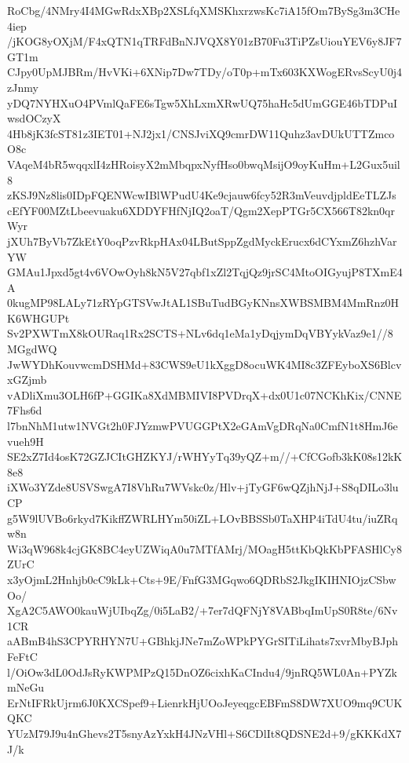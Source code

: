 RoCbg/4NMry4I4MGwRdxXBp2XSLfqXMSKhxrzwsKc7iA15fOm7BySg3m3CHe4iep
/jKOG8yOXjM/F4xQTN1qTRFdBnNJVQX8Y01zB70Fu3TiPZsUiouYEV6y8JF7GT1m
CJpy0UpMJBRm/HvVKi+6XNip7Dw7TDy/oT0p+mTx603KXWogERvsScyU0j4zJnmy
yDQ7NYHXuO4PVmlQaFE6sTgw5XhLxmXRwUQ75haHc5dUmGGE46bTDPuIwsdOCzyX
4Hb8jK3fcST81z3IET01+NJ2jx1/CNSJviXQ9cmrDW11Quhz3avDUkUTTZmcoO8c
VAqeM4bR5wqqxlI4zHRoisyX2mMbqpxNyfHso0bwqMsijO9oyKuHm+L2Gux5uil8
zKSJ9Nz8lis0IDpFQENWcwIBlWPudU4Ke9cjauw6fcy52R3mVeuvdjpldEeTLZJs
cEfYF00MZtLbeevuaku6XDDYFHfNjIQ2oaT/Qgm2XepPTGr5CX566T82kn0qrWyr
jXUh7ByVb7ZkEtY0oqPzvRkpHAx04LButSppZgdMyckErucx6dCYxmZ6hzhVarYW
GMAu1Jpxd5gt4v6VOwOyh8kN5V27qbf1xZl2TqjQz9jrSC4MtoOIGyujP8TXmE4A
0kugMP98LALy71zRYpGTSVwJtAL1SBuTudBGyKNnsXWBSMBM4MmRnz0HK6WHGUPt
Sv2PXWTmX8kOURaq1Rx2SCTS+NLv6dq1eMa1yDqjymDqVBYykVaz9e1//8MGgdWQ
JwWYDhKouvwcmDSHMd+83CWS9eU1kXggD8ocuWK4MI8c3ZFEyboXS6BlcvxGZjmb
vADliXmu3OLH6fP+GGIKa8XdMBMIVI8PVDrqX+dx0U1c07NCKhKix/CNNE7Fhs6d
l7bnNhM1utw1NVGt2h0FJYzmwPVUGGPtX2eGAmVgDRqNa0CmfN1t8HmJ6evueh9H
SE2xZ7Id4osK72GZJCItGHZKYJ/rWHYyTq39yQZ+m//+CfCGofb3kK08s12kK8e8
iXWo3YZde8USVSwgA7I8VhRu7WVskc0z/Hlv+jTyGF6wQZjhNjJ+S8qDILo3luCP
g5W9lUVBo6rkyd7KikffZWRLHYm50iZL+LOvBBSSb0TaXHP4iTdU4tu/iuZRqw8n
Wi3qW968k4cjGK8BC4eyUZWiqA0u7MTfAMrj/MOagH5ttKbQkKbPFASHlCy8ZUrC
x3yOjmL2Hnhjb0cC9kLk+Cts+9E/FnfG3MGqwo6QDRbS2JkgIKIHNIOjzCSbwOo/
XgA2C5AWO0kauWjUIbqZg/0i5LaB2/+7er7dQFNjY8VABbqImUpS0R8te/6Nv1CR
aABmB4hS3CPYRHYN7U+GBhkjJNe7mZoWPkPYGrSITiLihats7xvrMbyBJphFeFtC
l/OiOw3dL0OdJsRyKWPMPzQ15DnOZ6cixhKaCIndu4/9jnRQ5WL0An+PYZkmNeGu
ErNtIFRkUjrm6J0KXCSpef9+LienrkHjUOoJeyeqgcEBFmS8DW7XUO9mq9CUKQKC
YUzM79J9u4nGhevs2T5snyAzYxkH4JNzVHl+S6CDlIt8QDSNE2d+9/gKKKdX7J/k
